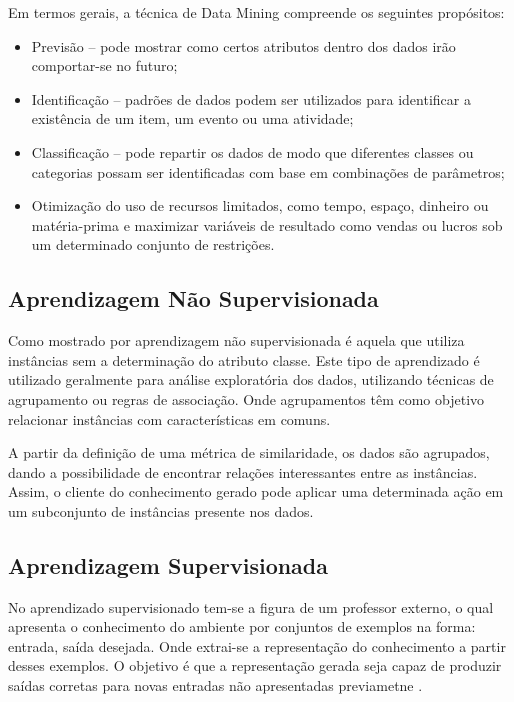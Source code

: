 \documentclass[
	12pt,				%
	openright,			%
	oneside,	
	a4paper,				%
	english,				%
	brazil				%
]{abntex2/abntex2} %
\begin{document}
		Em termos gerais, a técnica de Data Mining compreende os seguintes propósitos:
		
		\begin{itemize}
			\item Previsão – pode mostrar como certos atributos dentro dos dados irão comportar-se no futuro;
			\item Identificação – padrões de dados podem ser utilizados para identificar a existência de um item, um evento ou uma atividade;
			\item Classificação – pode repartir os dados de modo que diferentes classes ou categorias possam ser identificadas com base em combinações de parâmetros;
			\item Otimização do uso de recursos limitados, como tempo, espaço, dinheiro ou matéria-prima e maximizar variáveis de resultado como vendas ou lucros sob um determinado conjunto de restrições.
		\end{itemize}
	\vspace{-1.5\baselineskip}	
	\subsection{Aprendizagem Não Supervisionada}
	\vspace{1\baselineskip}
		Como mostrado por \cite{damasceno:2005} aprendizagem não supervisionada é aquela que utiliza instâncias sem a determinação do atributo classe. Este  tipo de aprendizado é utilizado geralmente para análise exploratória dos dados, utilizando técnicas de  agrupamento ou regras de associação. Onde agrupamentos têm como objetivo relacionar instâncias com características em comuns.
		
		A partir da definição de uma métrica de similaridade, os dados são  agrupados, dando a possibilidade de encontrar relações interessantes entre as instâncias. Assim, o cliente do conhecimento gerado pode aplicar uma determinada ação em um subconjunto de instâncias presente nos  dados. 
	\vspace{-1.5\baselineskip}	
	\subsection{Aprendizagem Supervisionada}
	\vspace{1\baselineskip}
	No aprendizado supervisionado tem-se a figura de um professor externo, o qual apresenta o conhecimento do ambiente por conjuntos de exemplos na forma: entrada, saída desejada. Onde extrai-se a representação do conhecimento a partir desses exemplos. O objetivo é que a representação gerada seja capaz de produzir saídas corretas para novas entradas não apresentadas previametne \cite{lorena:2007}.
	\vspace{-1.5\baselineskip}
\end{document}
